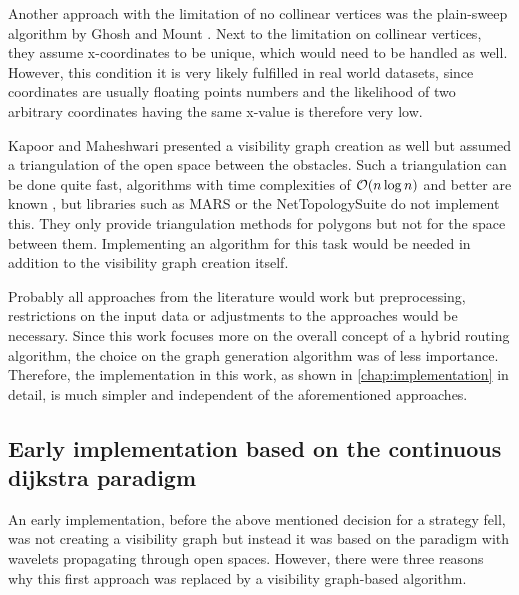 		Another approach with the limitation of no collinear vertices was the plain-sweep algorithm by Ghosh and Mount \cite{ghosh-output-sensitive-vgraph}.
		Next to the limitation on collinear vertices, they assume x-coordinates to be unique, which would need to be handled as well.
		However, this condition it is very likely fulfilled in real world datasets, since coordinates are usually floating points numbers and the likelihood of two arbitrary coordinates having the same x-value is therefore very low.
		
		Kapoor and Maheshwari presented a visibility graph creation as well \cite{kapoor-shortest-path-vgraph} but assumed a triangulation of the open space between the obstacles.
		Such a triangulation can be done quite fast, algorithms with time complexities of $\mathcal{O}(n \log{n})$ and better are known \cite[58-60]{de-berg-computational-geometry}, but libraries such as MARS or the NetTopologySuite do not implement this.
		They only provide triangulation methods for polygons but not for the space between them.
		Implementing an algorithm for this task would be needed in addition to the visibility graph creation itself.
		
		Probably all approaches from the literature would work but preprocessing, restrictions on the input data or adjustments to the approaches would be necessary.
		Since this work focuses more on the overall concept of a hybrid routing algorithm, the choice on the graph generation algorithm was of less importance.
		Therefore, the implementation in this work, as shown in \cref{chap:implementation} in detail, is much simpler and independent of the aforementioned approaches.
		
	\subsection{Early implementation based on the continuous dijkstra paradigm}
		
		An early implementation, before the above mentioned decision for a strategy fell, was not creating a visibility graph but instead it was based on the  paradigm with wavelets propagating through open spaces.
		However, there were three reasons why this first approach was replaced by a visibility graph-based algorithm.
		
